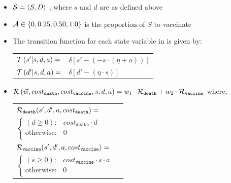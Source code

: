 \begin{itemize}
    \item {\footnotesize $ \mathcal{S} = \left\langle S, D \right\rangle$ }, where $ s $ and $ d $ are as defined above
    \item {\footnotesize $ \mathcal{A} \in \left\lbrace 0, 0.25, 0.50, 1.0 \right\rbrace $} is the proportion of $ S $ to vaccinate
    \item The transition function {\footnotesize \Transition} for each state variable in {\footnotesize \State} is given by:    \\
    {\footnotesize 
        \abovedisplayskip=5pt
        \belowdisplayskip=0pt
        \renewcommand{\arraystretch}{1.5}
        \begin{tabular}{ll}
            $ \mathcal{T}\left( s' | s, d, a \right) =$ & $ \delta \left[ s' - (- s \cdot (\eta + a)) \right] $ \\
            $ \mathcal{T}\left( d' | s, d, a \right) =$ & $ \delta \left[ d' - (\eta \cdot s) \right] $ \\
        \end{tabular}
    }%
    \item {\footnotesize $ \mathcal{R}\left(\vec{w}, cost_{\mathtt{death}}, cost_{\mathtt{vaccine}}, s, d, a \right) = w_1 \cdot \mathcal{R}_{\mathtt{death}} + w_2 \cdot \mathcal{R}_{\mathtt{vaccine}}$} where, \\
    {\footnotesize 
        \abovedisplayskip=10pt
        \belowdisplayskip=0pt
        \renewcommand{\arraystretch}{1.5}
        \begin{tabular}{ll}    
            $ \mathcal{R}_{\mathtt{death}}(s', d', a, cost_{\mathtt{death}}) = $ &  $ $ \\
                \qquad $ \begin{cases}
                (d \geq 0) : & cost_{\mathtt{death}} \cdot d \\
                \text{otherwise} : & 0 \\
                \end{cases} $ & $ $ \\
            $ \mathcal{R}_{\mathtt{vaccine}}(s', d', a, cost_{\mathtt{vaccine}}) = $ &  $ $ \\
                \qquad $ \begin{cases}
                (s \geq 0) : & cost_{\mathtt{vaccine}} \cdot s \cdot a \\
                \text{otherwise} : & 0 \\
                \end{cases} $ & $ $ \\
        \end{tabular}
    }    
\end{itemize} 

